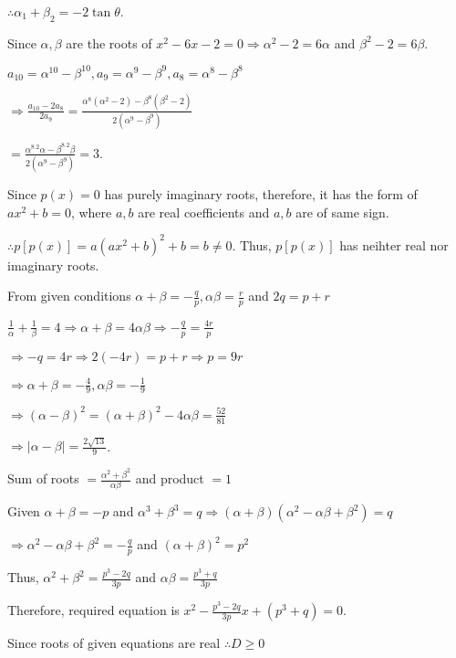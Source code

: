   $\therefore \alpha_1 + \beta_2 = -2\tan\theta$.
\item Since $\alpha, \beta$ are the roots of $x^2 - 6x - 2 = 0 \Rightarrow \alpha^2 -2 = 6\alpha$ and
  $\beta^2 -2 = 6\beta$.

  $a_{10} = \alpha^{10} - \beta^{10}, a_9 = \alpha^9 - \beta^9, a_8 = \alpha^8 - \beta^8$

  $\Rightarrow \frac{a_{10} - 2a_8}{2a_9} = \frac{\alpha^8\left(\alpha^2 - 2\right) - \beta^8\left(\beta^2
  - 2\right)}{2\left(\alpha^9 - \beta^9\right)}$

  $= \frac{\alpha^8.2\alpha - \beta^8.2\beta}{2\left(\alpha^9 - \beta^9\right)} = 3$.
\item Since $p(x) = 0$ has purely imaginary roots, therefore, it has the form of $ax^2 + b = 0$, where $a,
  b$ are real coefficients and $a, b$ are of same sign.

  $\therefore p[p(x)] = a\left(ax^2 + b\right)^2 + b = b\neq 0$. Thus, $p[p(x)]$ has neihter real nor
  imaginary roots.
\item From given conditions $\alpha + \beta = -\frac{q}{p}, \alpha\beta = \frac{r}{p}$ and $2q = p + r$

  $\frac{1}{\alpha} + \frac{1}{\beta} = 4 \Rightarrow \alpha + \beta = 4\alpha\beta\Rightarrow -\frac{q}{p}
  = \frac{4r}{p}$

  $\Rightarrow -q = 4r\Rightarrow 2(-4r) = p + r \Rightarrow p= 9r$

  $\Rightarrow \alpha + \beta = -\frac{4}{9}, \alpha\beta = -\frac{1}{9}$

  $\Rightarrow (\alpha - \beta)^2 = (\alpha + \beta)^2 - 4\alpha\beta = \frac{52}{81}$

  $\Rightarrow |\alpha - \beta| = \frac{2\sqrt{13}}{9}$.
\item Sum of roots $= \frac{\alpha^2 + \beta^2}{\alpha\beta}$ and product $= 1$

  Given $\alpha + \beta = -p$ and $\alpha^3 + \beta^3 = q\Rightarrow (\alpha + \beta)\left(\alpha^2
  - \alpha\beta + \beta^2\right) = q$

  $\Rightarrow \alpha^2 - \alpha\beta + \beta^2 = -\frac{q}{p}$ and $(\alpha + \beta)^2 = p^2$

  Thus, $\alpha^2 + \beta^2 = \frac{p^3 - 2q}{3p}$ and $\alpha\beta = \frac{p^3 + q}{3p}$

  Therefore, required equation is $x^2 - \frac{p^3 - 2q}{3p}x + (p^3 + q) = 0$.
\item Since roots of given equations are real $\therefore D\geq 0$

